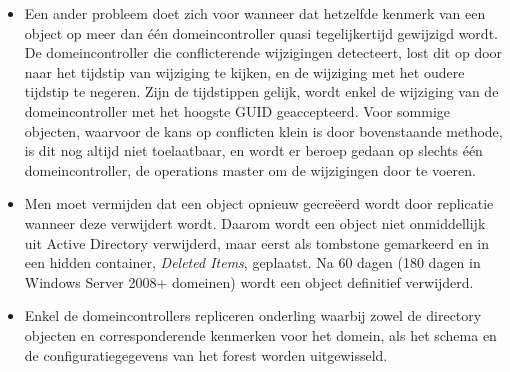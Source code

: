 \begin{enumerate}
{\begin{itemize}
\begin{itemize}
					\item Een ander probleem doet zich voor wanneer dat hetzelfde kenmerk van een object op meer dan één domeincontroller quasi tegelijkertijd gewijzigd wordt. De domeincontroller die conflicterende wijzigingen detecteert, lost dit op door naar het tijdstip van wijziging te kijken, en de wijziging met het oudere tijdstip te negeren. Zijn de tijdstippen gelijk, wordt enkel de wijziging van de domeincontroller met het hoogste GUID geaccepteerd. Voor sommige objecten, waarvoor de kans op conflicten klein is door bovenstaande methode, is dit nog altijd niet toelaatbaar, en wordt er beroep gedaan op slechts één domeincontroller, de operations master om de wijzigingen door te voeren.
					\item Men moet vermijden dat een object opnieuw gecreëerd wordt door replicatie wanneer deze verwijdert wordt. Daarom wordt een object niet onmiddellijk uit Active Directory verwijderd, maar eerst als tombstone gemarkeerd en in een hidden container, \textit{Deleted Items}, geplaatst. Na 60 dagen (180 dagen in Windows Server 2008+ domeinen) wordt een object definitief verwijderd. 
				\end{itemize}
				

			\end{itemize}
		}
		
		 {
			\begin{itemize}
				\item Enkel de domeincontrollers repliceren onderling waarbij zowel de directory objecten en corresponderende kenmerken voor het domein, als het schema en de configuratiegegevens van het forest worden uitgewisseld.
			\end{itemize}

		}
		

\end{enumerate}
